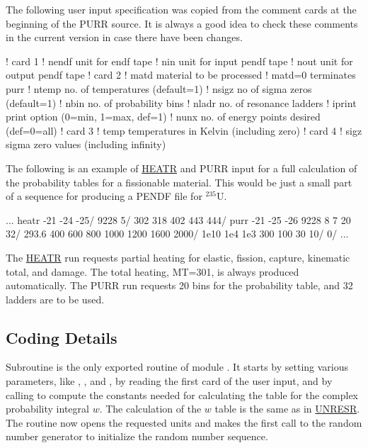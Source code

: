 The following user input specification was copied from the comment
cards at the beginning of the PURR source.  It is always a good idea to
check these comments in the current version in case there have
been changes.

\small
\begin{ccode}

   ! card 1
   !   nendf   unit for endf tape
   !   nin     unit for input pendf tape
   !   nout    unit for output pendf tape
   ! card 2
   !   matd    material to be processed
   !           matd=0 terminates purr
   !   ntemp   no. of temperatures (default=1)
   !   nsigz   no of sigma zeros (default=1)
   !   nbin    no. of probability bins
   !   nladr   no. of resonance ladders
   !   iprint  print option (0=min, 1=max, def=1)
   !   nunx    no. of energy points desired (def=0=all)
   ! card 3
   !   temp    temperatures in Kelvin (including zero)
   ! card 4
   !   sigz    sigma zero values (including infinity)

\end{ccode}
\normalsize

\noindent
The following is an example of \hyperlink{sHEATRhy}{HEATR}
and PURR input for a full
calculation of the probability tables for a fissionable material.
This would be just a small part of a sequence for producing a
PENDF file for $^{235}$U.

\small
\begin{ccode}
    ...
    heatr
    -21 -24 -25/
    9228 5/
    302 318 402 443 444/
    purr
    -21 -25 -26
    9228 8 7 20 32/
    293.6 400 600 800 1000 1200 1600 2000/
    1e10 1e4 1e3 300 100 30 10/
    0/
    ...

\end{ccode}
\normalsize

\noindent
The \hyperlink{sHEATRhy}{HEATR} run requests
partial heating for elastic, fission, capture,
kinematic total, and damage.  The total heating, MT=301, is always
produced automatically.  The PURR run requests 20 bins for the
probability table, and 32 ladders are to be used.

\noindent

\subsection{Coding Details}
\label{ssPURR_details}

Subroutine  is the only exported
routine of module .
It starts by setting various parameters, like , ,
and , by reading the first card of the user input, and by
calling  to compute the constants needed for calculating
the table for the complex probability integral $w$.  The calculation of
the $w$ table is the same as in
\hyperlink{sUNRESRhy}{UNRESR}.  The routine now opens the
requested units and  makes the first call to the random number generator
 to initialize the random number sequence.

